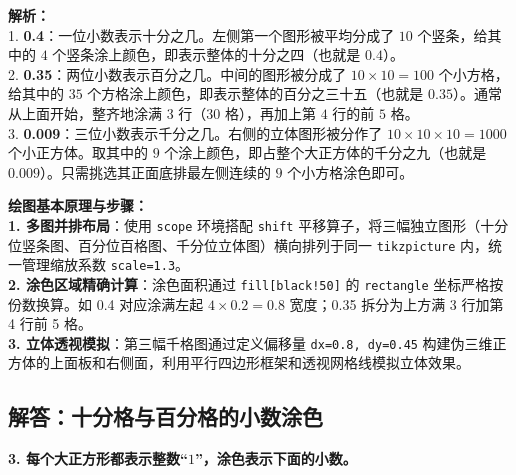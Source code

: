 \vspace{0.6cm}
{\small\color{gray}
\textbf{解析：}\\
1. \textbf{0.4}：一位小数表示十分之几。左侧第一个图形被平均分成了 $10$ 个竖条，给其中的 $4$ 个竖条涂上颜色，即表示整体的十分之四（也就是 $0.4$）。\\
2. \textbf{0.35}：两位小数表示百分之几。中间的图形被分成了 $10 \times 10 = 100$ 个小方格，给其中的 $35$ 个方格涂上颜色，即表示整体的百分之三十五（也就是 $0.35$）。通常从上面开始，整齐地涂满 $3$ 行（$30$ 格），再加上第 $4$ 行的前 $5$ 格。\\
3. \textbf{0.009}：三位小数表示千分之几。右侧的立体图形被分作了 $10 \times 10 \times 10 = 1000$ 个小正方体。取其中的 $9$ 个涂上颜色，即占整个大正方体的千分之九（也就是 $0.009$）。只需挑选其正面底排最左侧连续的 $9$ 个小方格涂色即可。
}

\vspace{0.6cm}

{\small\color{blue!70!black}
\textbf{绘图基本原理与步骤：}\\
\textbf{1. 多图并排布局}：使用 \texttt{scope} 环境搭配 \texttt{shift} 平移算子，将三幅独立图形（十分位竖条图、百分位百格图、千分位立体图）横向排列于同一 \texttt{tikzpicture} 内，统一管理缩放系数 \texttt{scale=1.3}。\\
\textbf{2. 涂色区域精确计算}：涂色面积通过 \texttt{fill[black!50]} 的 \texttt{rectangle} 坐标严格按份数换算。如 0.4 对应涂满左起 $4 \times 0.2 = 0.8$ 宽度；0.35 拆分为上方满 3 行加第 4 行前 5 格。\\
\textbf{3. 立体透视模拟}：第三幅千格图通过定义偏移量 \texttt{dx=0.8, dy=0.45} 构建伪三维正方体的上面板和右侧面，利用平行四边形框架和透视网格线模拟立体效果。
}

\newpage

\subsection{解答：十分格与百分格的小数涂色}

\vspace{0.4cm}

\noindent\textbf{3. 每个大正方形都表示整数“$1$”，涂色表示下面的小数。}

\vspace{0.8cm}

